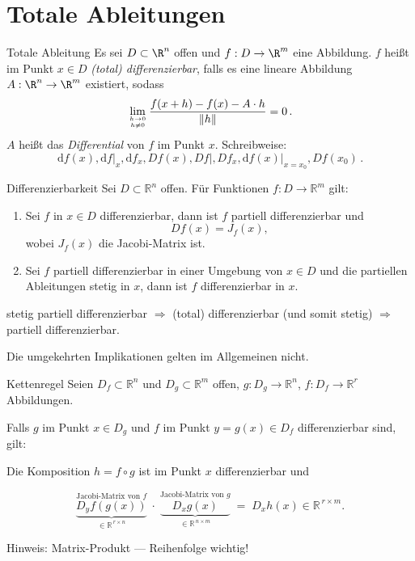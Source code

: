 \newpage
\section{Totale Ableitungen}
\label{4.2}

\begin{definition}{Totale Ableitung}
    Es sei $D \subset \R^n$ offen und $f : D \to \R^m$ eine Abbildung.
    $f$ heißt im Punkt $x \in D$ \emph{(total) differenzierbar}, falls es eine lineare Abbildung $A : \R^n \to \R^m$ existiert, sodass
    $$
        \lim_{h\to 0 \atop h\neq 0} \frac{f(x+h) - f(x) - A \cdot h}{\|h\|} = 0 \, .
    $$
    $A$ heißt das \emph{Differential} von $f$ im Punkt $x$.
    Schreibweise:
    $$
        \mathrm{d}f(x), \mathrm{d}f\big|_{x}, \mathrm{d}f_x, Df(x), Df\!\big|, Df_x, \mathrm{d}f(x)\big|_{x=x_0}, Df(x_0) \, .
    $$
\end{definition}

\begin{satz}{Differenzierbarkeit}
    Sei $D\subset\mathbb{R}^n$ offen. Für Funktionen $f\colon D\to\mathbb{R}^m$ gilt:

    \begin{enumerate}
    \item Sei $f$ in $x\in D$ differenzierbar, dann ist $f$ partiell differenzierbar und
    $$
    Df(x)=J_f(x),
    $$
    wobei $J_f(x)$ die Jacobi-Matrix ist.
    \item Sei $f$ partiell differenzierbar in einer Umgebung von $x\in D$ und die partiellen Ableitungen stetig in $x$, dann ist $f$ differenzierbar in $x$.
    \end{enumerate}   
\end{satz}

\begin{korollar}{}
    stetig partiell differenzierbar $\Longrightarrow$ (total) differenzierbar (und somit stetig) $\Longrightarrow$ partiell differenzierbar.

    Die umgekehrten Implikationen gelten im Allgemeinen nicht.   
\end{korollar}

\begin{satz}{Kettenregel}
    Seien $D_f\subset\mathbb{R}^n$ und $D_g\subset\mathbb{R}^m$ offen, $g: D_g\to\mathbb{R}^n$, $f: D_f\to\mathbb{R}^r$ Abbildungen.
    \vspace{1em}

    Falls $g$ im Punkt $x\in D_g$ und $f$ im Punkt $y=g(x)\in D_f$ differenzierbar sind, gilt:
    \vspace{1em}

    Die Komposition $h=f\circ g$ ist im Punkt $x$ differenzierbar und

    $$
    \underbrace{\overset{\text{Jacobi-Matrix von }f}{D_y f(g(x))}}_{\in\mathbb{R}^{\,r\times n}}
    \;\cdot\;
    \underbrace{\overset{\text{Jacobi-Matrix von }g}{D_x g(x)}}_{\in\mathbb{R}^{\,n\times m}}
    \;=\;
    D_x h(x)\in\mathbb{R}^{\,r\times m}.
    $$

    Hinweis: Matrix-Produkt — Reihenfolge wichtig!    
\end{satz}

